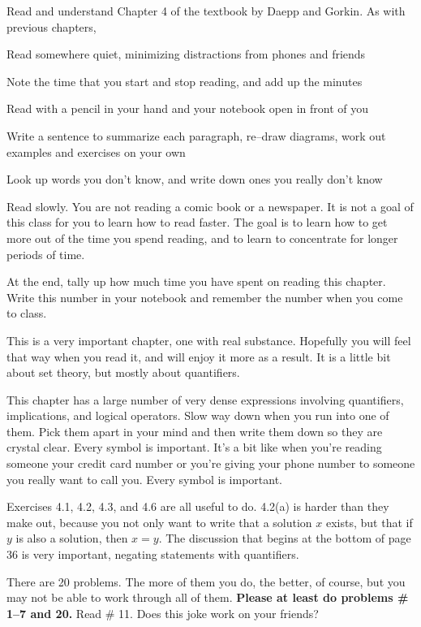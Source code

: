 
\noindent
Read and understand Chapter 4 of the textbook by Daepp and Gorkin.
As with previous chapters,
{\small
\blist{0.0in}
\item Read somewhere quiet, minimizing distractions from phones and friends
\item Note the time that you start and stop reading, and add up the minutes
\item Read with a pencil in your hand and your notebook open in front of you
\item Write a sentence to summarize each paragraph, re--draw diagrams, work out examples and exercises on your own
\item Look up words you don't know, and write down ones you really don't know
\item Read slowly.  You are not reading a comic book or a newspaper.  It is not a goal of this class for you to learn how to read faster.  The goal is to learn how to get more out of the time you spend reading, and to learn to concentrate for longer periods of time.
\item At the end, tally up how much time you have spent on reading this chapter.
Write this number in your notebook and remember the number when you come to class.
\elist
}

This is a very important chapter, one with real substance.  
Hopefully you will feel that way when you read it, and will enjoy it more as a result.
It is a little bit about set theory, but mostly about quantifiers.

This chapter has a large number of very dense expressions involving quantifiers, implications, and logical operators.  Slow way down when you run into one of them.  Pick them apart in your mind and then write them down so they are crystal clear.  Every symbol is important.  It's a bit like when you're reading someone your credit card number or you're giving your phone number to someone you really want to call you.  Every symbol is important.

Exercises 4.1, 4.2, 4.3, and 4.6 are all useful to do.
4.2(a) is harder than they make out, because you not only want to write that a solution $x$ exists, but that if $y$ is also a solution, then $x = y$.
The discussion that begins at the bottom of page 36 is very important, negating statements with quantifiers.

There are 20 problems.  The more of them you do, the better, of course, but you may not be able to work through all of them.  {\bf Please at least do problems \# 1--7 and 20.}  Read \# 11.  Does this joke work on your friends?

